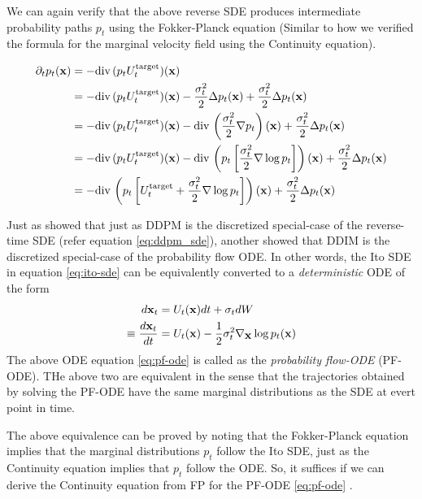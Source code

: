 \documentclass[a4paper, 11pt]{article}
\begin{document}
We can again verify that the above reverse SDE produces intermediate probability paths $p_t$ using the Fokker-Planck equation (Similar to how we verified the formula for the marginal velocity field using the Continuity equation).

\begin{align}
    \partial_t p_t(\mbox{$\mbox{$\mathbf{x}$}$}) &= - \text{div}\,(p_t U_t^{\text{target}})(\mbox{$\mbox{$\mathbf{x}$}$}) \\
    &= - \text{div}\,(p_t U_t^{\text{target}})(\mbox{$\mbox{$\mathbf{x}$}$}) - \frac{\sigma_t^2}{2}\Delta p_t(\mbox{$\mbox{$\mathbf{x}$}$}) + \frac{\sigma_t^2}{2}\Delta p_t(\mbox{$\mbox{$\mathbf{x}$}$}) \\
    &= - \text{div}\,(p_t U_t^{\text{target}})(\mbox{$\mbox{$\mathbf{x}$}$}) - \text{div}\, \left (\frac{\sigma_t^2}{2}\nabla p_t\right )(\mbox{$\mbox{$\mathbf{x}$}$})  + \frac{\sigma_t^2}{2}\Delta p_t(\mbox{$\mbox{$\mathbf{x}$}$}) \\
    &= - \text{div}\,(p_t U_t^{\text{target}})(\mbox{$\mbox{$\mathbf{x}$}$}) - \text{div}\, \left (p_t \left [ \frac{\sigma_t^2}{2}\nabla \log p_t \right ] \right )(\mbox{$\mbox{$\mathbf{x}$}$})  + \frac{\sigma_t^2}{2}\Delta p_t(\mbox{$\mbox{$\mathbf{x}$}$}) \\
    &= - \text{div}\, \left (p_t \left [U_t^{\text{target}} + \frac{\sigma_t^2}{2} \nabla \log p_t \right ] \right )(\mbox{$\mbox{$\mathbf{x}$}$})  + \frac{\sigma_t^2}{2}\Delta p_t(\mbox{$\mbox{$\mathbf{x}$}$}) \label{eq:fp-rev-sde}
\end{align}


Just as \cite{song2020score} showed that just as DDPM is the discretized special-case of the reverse-time SDE (refer equation \eqref{eq:ddpm_sde}), another \cite{song2020denoising} showed that DDIM is the discretized special-case of the probability flow ODE. In other words, the Ito SDE in equation \eqref{eq:ito-sde} can be equivalently converted to a \emph{deterministic} ODE of the form 
\begin{align}
    d\mbox{$\mbox{$\mathbf{x}$}$}_t &= U_t(\mbox{$\mbox{$\mathbf{x}$}$})dt + \sigma_t dW \\
    \equiv \frac{d\mbox{$\mbox{$\mathbf{x}$}$}_t}{dt} &= U_t(\mbox{$\mbox{$\mathbf{x}$}$}) - \frac{1}{2} \sigma_t^2 \nabla_{\mbox{$\mbox{$\mathbf{x}$}$}} \log p_t(\mbox{$\mbox{$\mathbf{x}$}$}) \label{eq:pf-ode}
\end{align}
The above ODE equation \eqref{eq:pf-ode} is called as the \emph{probability flow-ODE} (PF-ODE). THe above two are equivalent in the sense that the trajectories obtained by solving the PF-ODE have the same marginal distributions as the SDE at evert point in time.

The above equivalence can be proved by noting that the Fokker-Planck equation implies that the marginal distributions $p_t$ follow the Ito SDE, just as the Continuity equation implies that $p_t$ follow the ODE. So, it suffices if we can derive the Continuity equation from FP for the PF-ODE \eqref{eq:pf-ode} \citep{nakkiran2024step}.
\end{document}
